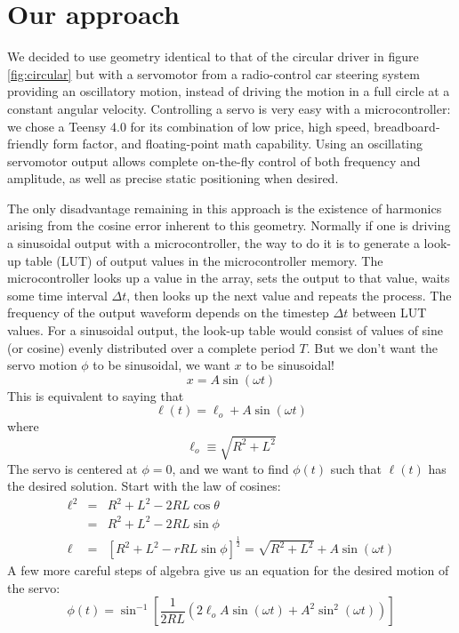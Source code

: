 \documentclass[prb,preprint]{revtex4-1}
\begin{document}
\section{Our approach}
We decided to use geometry identical to that of the circular driver in figure \ref{fig:circular} but with a servomotor from a radio-control car steering system providing an oscillatory motion, instead of driving the motion in a full circle at a constant angular velocity. 
Controlling a servo is very easy with a microcontroller: we chose a Teensy 4.0 for its combination of low price, high speed, breadboard-friendly form factor, and floating-point math capability.
Using an oscillating servomotor output allows complete on-the-fly control of both frequency and amplitude, as well as precise static positioning when desired. 

The only disadvantage remaining in this approach is the existence of harmonics arising from the cosine error inherent to this geometry. 
Normally if one is driving a sinusoidal output with a microcontroller, the way to do it is to generate a look-up table (LUT) of output values in the microcontroller memory.
The microcontroller looks up a value in the array, sets the output to that value, waits some time interval $\Delta t$, then looks up the next value and repeats the process. 
The frequency of the output waveform depends on the timestep $\Delta t$ between LUT values.
For a sinusoidal output, the look-up table would consist of values of sine (or cosine) evenly distributed over a complete period $T$.
But we don't want the servo motion $\phi$ to be sinusoidal, we want $x$ to be sinusoidal!
\begin{equation}
	x = A \sin(\omega t) 
\end{equation}
This is equivalent to saying that
\begin{equation}
	\ell(t) = \ell_o + A \sin(\omega t)
\end{equation}
where 
\begin{equation}
	\ell_o \equiv \sqrt{R^2+L^2}
\end{equation}
The servo is centered at $\phi=0$, and we want to find $\phi(t)$ such that $\ell(t)$ has the desired solution.
Start with the law of cosines:
\begin{eqnarray} 
	\ell^2 &=& R^2 + L^2 - 2 R L \cos\theta\\
		&=& R^2 + L^2 - 2 R L \sin\phi\\
	\ell &=& \left[ R^2+L^2 - r R L \sin\phi \right]^{\frac{1}{2}} = \sqrt{R^2+L^2} + A \sin(\omega t)
\end{eqnarray}
A few more careful steps of algebra give us an equation for the desired motion of the servo:
\begin{equation} \label{eq:phi}
	\phi(t) = \sin^{-1} \left[\frac{1}{2RL}\left(2\ell_o A\sin(\omega t) + A^2 \sin^2(\omega t)\right)\right]
\end{equation}
\end{document}
